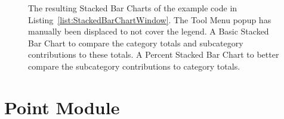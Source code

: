 \begin{figure}[tp]
\centering
{}
\hspace{1cm}
\caption[Stacked Bar Chart Window Example]{%
  The resulting Stacked Bar Charts of the example code in Listing~\ref{list:StackedBarChartWindow}. 
  The Tool Menu popup has manually been displaced to not cover the legend.
   A Basic Stacked Bar Chart to compare the category totals and subcategory contributions to these totals.
   A Percent Stacked Bar Chart to better compare the subcategory contributions to category totals. 
}
\label{fig:StackedBarChartWindow}
\end{figure}
  


\section{Point Module}

